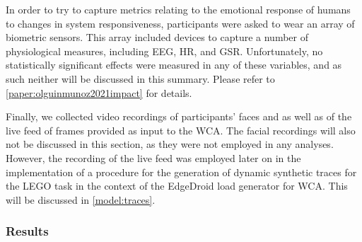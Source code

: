 In order to try to capture metrics relating to the emotional response of humans to changes in system responsiveness, participants were asked to wear an array of biometric sensors.
This array included devices to capture a number of physiological measures, including \gls{EEG}, \gls{HR}, and \gls{GSR}.
Unfortunately, no statistically significant effects were measured in any of these variables, and as such neither will be discussed in this summary.
Please refer to \cref{paper:olguinmunoz2021impact} for details.

Finally, we collected video recordings of participants' faces and as well as of the live feed of frames provided as input to the \gls{WCA}.
The facial recordings will also not be discussed in this section, as they were not employed in any analyses.
However, the recording of the live feed was employed later on in the implementation of a procedure for the generation of dynamic synthetic traces for the LEGO task in the context of the EdgeDroid load generator for \gls{WCA}.
This will be discussed in \cref{model:traces}.

\subsubsection{Results}\label{impact:results}

